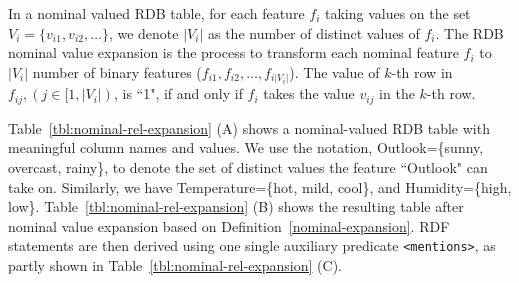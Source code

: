 \begin{mydef}
\label{nominal-expansion}
In a nominal valued RDB table, for each feature $f_i$ taking values on the set $V_i=\{v_{i1}, v_{i2}, \ldots\}$, we denote $|V_i|$ as the number of distinct values of $f_i$. The RDB nominal value expansion is the process to transform each nominal feature $f_i$ to $|V_i|$ number of binary features ($f_{i1}, f_{i2}, \ldots, f_{i|V_i|}$). The value of $k$-th row in $f_{ij}, (j\in [1, |V_i|)$, is ``1", if and only if $f_i$ takes the value $v_{ij}$ in the $k$-th row.
\end{mydef}

\begin{myexp}
Table~\ref{tbl:nominal-rel-expansion} (A) shows a nominal-valued RDB table with meaningful column names and values. We use the notation, Outlook=\{sunny, overcast, rainy\}, to denote the set of distinct values the feature ``Outlook" can take on. Similarly, we have Temperature=\{hot, mild, cool\}, and Humidity=\{high, low\}. Table~\ref{tbl:nominal-rel-expansion} (B) shows the resulting table after nominal value expansion based on Definition~\ref{nominal-expansion}. RDF statements are then derived using one single auxiliary predicate \texttt{<mentions>}, as partly shown in Table~\ref{tbl:nominal-rel-expansion} (C).
\end{myexp}

